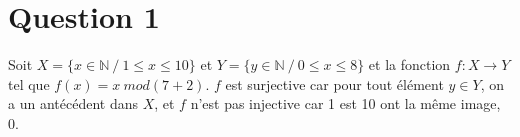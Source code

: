\section*{Question 1}

Soit $X = \{ x \in \mathbb{N} \ / \ 1 \leq x \leq 10\}$ et   $Y = \{ y \in \mathbb{N} \ / \ 0 \leq x \leq 8\}$ et la fonction $f : X \rightarrow Y$ tel que $f(x) = x \ mod (7 + 2)$. $f$ est surjective car pour tout élément $y \in Y$, on a un antécédent dans $X$, et $f$ n’est pas injective car 1 est 10 ont la même image, 0.
